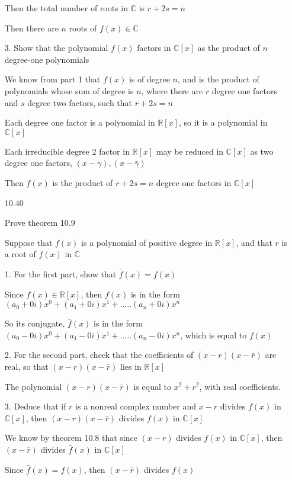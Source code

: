 \documentclass[12pt]{article}
\begin{document}
\begin{itemize}
	Then the total number of roots in $\mathbb{C}$ is $r + 2s = n$

	Then there are $n$ roots of $f(x) \in \mathbb{C}$

	3. Show that the polynomial $f(x)$ factors in $\mathbb{C}[x]$ as the product of $n$ degree-one polynomials

	We know from part 1 that $f(x)$ is of degree $n$, and is the product of polynomials whose sum of degree is $n$, where there are $r$ degree one factors and $s$ degree two factors, such that $r + 2s = n$

	Each degree one factor is a polynomial in $\mathbb{R}[x]$, so it is a polynomial in $\mathbb{C}[x]$

	Each irreducible degree 2 factor in $\mathbb{R}[x]$ may be reduced in $\mathbb{C}[x]$ as two degree one factors, $(x-\gamma),(x-\bar{\gamma})$

	Then $f(x)$ is the product of $r + 2s = n$ degree one factors in $\mathbb{C}[x]$

\newpage

\item[10.40]

	Prove theorem 10.9

	Suppose that $f(x)$ is a polynomial of positive degree in $\mathbb{R}[x]$, and that $r$ is a root of $f(x)$ in $\mathbb{C}$

	1. For the first part, show that $\bar{f}(x) = f(x)$

	Since $f(x) \in \mathbb{R}[x]$, then $f(x)$ is in the form $(a_0 + 0i)x^0 + (a_1 + 0i)x^1 + ..... (a_n + 0i)x^n$

	So its conjugate, $\bar{f}(x)$ is in the form $(a_0 - 0i)x^0 + (a_1 - 0i)x^1 + ..... (a_n - 0i)x^n$, which is equal to $f(x)$

	2. For the second part, check that the coefficients of $(x-r)(x-\bar{r})$ are real, so that $(x-r)(x-\bar{r})$ lies in $\mathbb{R}[x]$

	The polynomial $(x-r)(x-\bar{r})$ is equal to $x^2 + r^2$, with real coefficients.

	3. Deduce that if $r$ is a nonreal complex number and $x-r$ divides $f(x)$ in $\mathbb{C}[x]$, then $(x-r)(x-\bar{r})$ divides $f(x)$ in $\mathbb{C}[x]$

	We know by theorem 10.8 that since $(x-r)$ divides $f(x)$ in $\mathbb{C}[x]$, then $(x-\bar{r})$ divides $\bar{f}(x)$ in $\mathbb{C}[x]$

	Since $\bar{f}(x) = f(x)$, then $(x-\bar{r})$ divides $f(x)$


\end{itemize}
\end{document}
